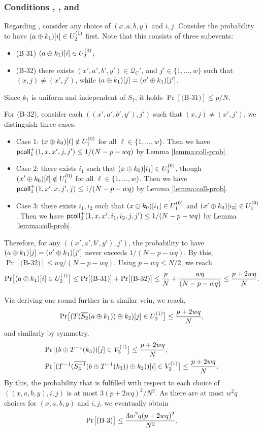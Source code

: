 
%

\subsubsection{Conditions \bthree, \bfour, and \bfive}


Regarding \bthree, consider any choice of $(x,a,b,y)$ and $i, j$. Consider the probability to have $(a\oplus k_1)[i]\in U_2^{(1)}$ first. Note that this consists of three subevents:
\begin{itemize}
	\item(B-31) $(a\oplus k_1)[i]\in U_2^{(0)}$;
	\item(B-32) there exists $(x',a',b',y')\in\mathcal{Q}_{C}'$, and $j'\in\{1,\ldots,w\}$ such that $(x,j)\neq(x',j')$, while $(a\oplus k_1)[j]=(a'\oplus k_1)[j']$.
\end{itemize}
Since $k_1$ is uniform and independent of $S_1$, it holds $\Pr[\text{(B-31)}]\leq p/N$.


For (B-32), consider each $((x',a',b',y'),j')$ such that $(x,j)\neq(x',j')$, we distinguish three cases.
\begin{itemize}
	\item Case 1: $(x\oplus k_0)[\ell]\notin U_1^{(0)}$ for all $\ell\in\{1,\ldots,w\}$. Then we have $\mathsf{pcoll}_{1}^+(1,x,x',j,j')\leq1/(N-p-wq)$ by Lemma \ref{lemma:coll-prob}.
	\item Case 2: there exists $i_1$ such that $(x\oplus k_0)[i_1]\in U_1^{(0)}$, though $(x'\oplus k_0)[\ell]\notin U_1^{(0)}$ for all $\ell\in\{1,\ldots,w\}$. Then we have $\mathsf{pcoll}_{1}^+(1,x',x,j',j)\leq1/(N-p-wq)$ by Lemma \ref{lemma:coll-prob}.
	\item Case 3: there exists $i_1,i_2$ such that $(x\oplus k_0)[i_1]\in U_1^{(0)}$ and $(x'\oplus k_0)[i_2]\in U_1^{(0)}$. Then we have  $\mathsf{pcoll}_{2}^+(1,x,x',i_1,i_2,j,j')\leq1/(N-p-wq)$ by Lemma \ref{lemma:coll-prob}.
\end{itemize}
%
Therefore, for any $((x',a',b',y'),j')$, the probability to have $(a\oplus k_1)[j]=(a'\oplus k_1)[j']$ never exceeds $1/(N-p-wq)$. By this, $\Pr[\text{(B-32)}]\leq wq/(N-p-wq)$. Using $p+wq\leq N/2$, we reach
%
$${\Pr}\big[(a\oplus k_1)[i]\in U_2^{(1)}\big]
\leq\Pr[\text{(B-31)}]+\Pr[\text{(B-32)}]\leq
\frac{p}{N}+\frac{wq}{(N-p-wq)}\leq\frac{p+2wq}{N}.$$
%

Via deriving one round further in a similar vein, we reach,
%
$${\Pr}\big[(T(\overline{S_2}(a \oplus k_1))\oplus k_2)[j]\in U_{3}^{(1)}\big]\leq\frac{p+2wq}{N},$$
%
and similarly by symmetry,
%
\begin{align*}
&{\Pr}\big[(b\oplus T^{-1}(k_3))[j]\in V_3^{(1)}\big]\leq\frac{p+2wq}{N},       \\
&{\Pr}\big[(T^{-1}(\overline{S_3^{-1}}(b\oplus T^{-1}(k_3))\oplus k_2))[i]\in V_2^{(1)}\big]\leq\frac{p+2wq}{N}.
\end{align*}
%
By this, the probability that \bthree is fulfilled with respect to each choice of $((x,a,b,y),i, j)$ is at most $3(p+2wq)^2/N^2$. As there are at most $w^2q$ choices for $(x,a,b,y)$ and $i, j$, we eventually obtain
%
$$
{\Pr}\big[\text{(B-3)}\big] \leq \frac{3w^2q(p+2wq)^2}{N^2}.
$$



